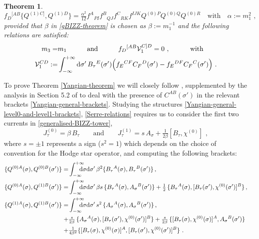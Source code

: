 \documentclass[12pt]{article}
\newtheorem{thm}{Theorem}[section]
\numberwithin{equation}{section}
\begin{document}
\begin{thm}
\begin{equation}
f_{D}{}^{[AB}\{Q^{(1)C]},Q^{(1)D}\}=\tfrac{\alpha^2}{12}f^{A}{}_{PI}f^{B}{}_{QJ}f^{C}{}_{RK}f^{IJK}Q^{(0)P}Q^{(0)Q}Q^{(0)R} 
\quad \text{with} \quad
\alpha:=m_{1}^2 \,\, ,
\end{equation}
provided that $\beta$ in \eqref{gBIZZ-theorem} is chosen as $\beta:=m_{1}^{-1}$ and the following relations are satisfied:
\begin{equation}\label{Yangian-theorem-condition}
\begin{aligned}
m_{3} =&m_{1} \qquad \quad \text{and} \qquad\quad f_{D}{}^{[AB}\mathcal{V}_{1}^{C]D}=0 \,\, , 
\qquad\quad \text{with} 
\\
\mathcal{V}_{1}^{CD}:=&
\int_{-\infty}^{+\infty}\mathrm{d}\sigma' \,   B_{\tau}{}^{E}(\sigma')\Bigl(f_{E}{}^{CF}C_{F}{}^{D}(\sigma')-f_{E}{}^{DF}C_{F}{}^{C}(\sigma')\Bigr) \,\, .
\end{aligned}
\end{equation}
\end{thm}
To prove Theorem \ref{Yangian-theorem} we will closely follow \cite{MacKay:1992he}, supplemented by the analysis in Section 5.2 of \cite{Klose:2016qfv} to deal with the presence of $C^{AB}(\sigma')$ in the relevant brackets \eqref{Yangian-general-brackets}. Studying the structures \eqref{Yangian-general-level0-and-level1-brackets}, \eqref{Serre-relations} requires us to consider the first two currents in \eqref{generalised-BIZZ-tower},
\begin{equation}\label{Yangian-currents-we-need}
J_{\tau}^{(0)}=\beta \, B_{\tau}
\qquad \text{and} \qquad 
J_{\tau}^{(1)}=s \, A_{\sigma}+\tfrac{1}{2\beta}[B_{\tau},\chi^{(0)}] \,\, ,
\end{equation}
where $s=\pm 1$ represents a sign ($s^2=1$) which depends on the choice of convention for the Hodge star operator, and computing the following brackets:
\begin{align}\label{Yangian-brackets-to-compute}
\{Q^{(0)A}(\sigma),Q^{(0)B}(\sigma')\}=&\int_{-\infty}^{+\infty}\!\!\!\!\!\!\mathrm{d}\sigma
\mathrm{d}\sigma' \, \beta^2 \{B_{\tau}{}^{A}(\sigma),B_{\tau}{}^{B}(\sigma')\} \, ,
\\
\{Q^{(0)A}(\sigma),Q^{(1)B}(\sigma')\}=& \int_{-\infty}^{+\infty} \!\!\!\!\!\! \mathrm{d}\sigma
\mathrm{d}\sigma' \, \beta s \, \{B_{\tau}{}^{A}(\sigma),A_{\sigma}{}^{B}(\sigma')\}+\tfrac{1}{2} \, \{B_{\tau}{}^{A}(\sigma),[B_{\tau}(\sigma'),\chi^{(0)}(\sigma')]^{B}\} \, ,
\notag \\
\{Q^{(1)A}(\sigma),Q^{(1)B}(\sigma')\}=& \int_{-\infty}^{+\infty} \!\!\!\!\!\! \mathrm{d}\sigma
\mathrm{d}\sigma' \, s^2 \, \{A_{\sigma}{}^{A}(\sigma),A_{\sigma}{}^{B}(\sigma')\} \, ,
\notag \\
+&\tfrac{s}{2\beta} \, \{A_{\sigma}{}^{A}(\sigma),[B_{\tau}(\sigma'),\chi^{(0)}(\sigma')]^{B}\}+\tfrac{s}{2\beta} \, \{[B_{\tau}(\sigma),\chi^{(0)}(\sigma)]^{A},A_{\sigma}{}^{B}(\sigma')\}
\notag \\
+&\tfrac{1}{4\beta^2}
\{ [B_{\tau}(\sigma),\chi^{(0)}(\sigma)]^{A} ,[B_{\tau}(\sigma'),\chi^{(0)}(\sigma')]^{B}  \} \,\, .
\notag
\end{align}
\end{document}
